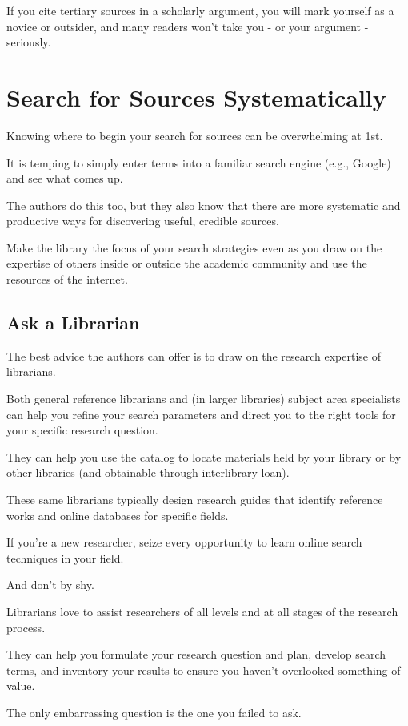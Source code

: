 \documentclass[oneside]{book}
\numberwithin{equation}{section}
\begin{document}
If you cite tertiary sources in a scholarly argument, you will mark yourself as a novice or outsider, and many readers won't take you - or your argument - seriously.

\section{Search for Sources Systematically}
Knowing where to begin your search for sources can be overwhelming at 1st.

It is temping to simply enter terms into a familiar search engine (e.g., Google) and see what comes up.

The authors do this too, but they also know that there are more systematic and productive ways for discovering useful, credible sources.

Make the library the focus of your search strategies even as you draw on the expertise of others inside or outside the academic community and use the resources of the internet.

\subsection{Ask a Librarian}
The best advice the authors can offer is to draw on the research expertise of librarians.

Both general reference librarians and (in larger libraries) subject area specialists can help you refine your search parameters and direct you to the right tools for your specific research question.

They can help you use the catalog to locate materials held by your library or by other libraries (and obtainable through interlibrary loan).

These same librarians typically design research guides that identify reference works and online databases for specific fields.

If you're a new researcher, seize every opportunity to learn online search techniques in your field.

%
And don't by shy.

Librarians love to assist researchers of all levels and at all stages of the research process.

They can help you formulate your research question and plan, develop search terms, and inventory your results to ensure you haven't overlooked something of value.

The only embarrassing question is the one you failed to ask.
\end{document}

